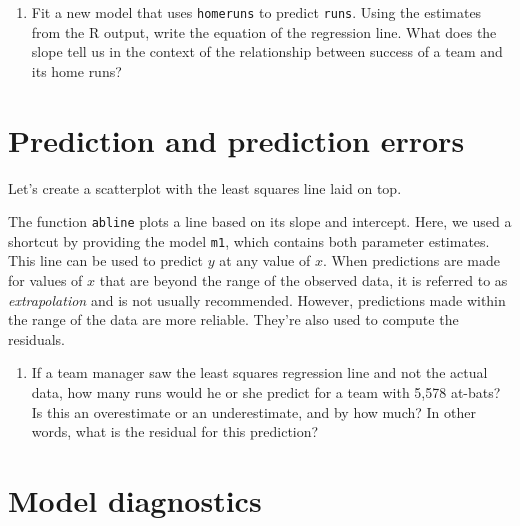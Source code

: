 \documentclass[]{book}
\newenvironment{Shaded}{\begin{snugshade}}{\end{snugshade}}
\newcommand{\KeywordTok}[1]{\textcolor[rgb]{0.13,0.29,0.53}{\textbf{{#1}}}}
\newcommand{\StringTok}[1]{\textcolor[rgb]{0.31,0.60,0.02}{{#1}}}
\newcommand{\NormalTok}[1]{{#1}}
\providecommand{\tightlist}{%
  \setlength{\itemsep}{0pt}\setlength{\parskip}{0pt}}
\theoremstyle{definition}
\theoremstyle{definition}
\theoremstyle{remark}
\begin{document}
\begin{enumerate}
\def\labelenumi{\arabic{enumi}.}
\setcounter{enumi}{3}
\tightlist
\item
  Fit a new model that uses \texttt{homeruns} to predict \texttt{runs}.
  Using the estimates from the R output, write the equation of the
  regression line. What does the slope tell us in the context of the
  relationship between success of a team and its home runs?
\end{enumerate}

\section*{Prediction and prediction
errors}\label{prediction-and-prediction-errors}

Let's create a scatterplot with the least squares line laid on top.

\begin{Shaded}
\end{Shaded}

The function \texttt{abline} plots a line based on its slope and
intercept. Here, we used a shortcut by providing the model \texttt{m1},
which contains both parameter estimates. This line can be used to
predict \(y\) at any value of \(x\). When predictions are made for
values of \(x\) that are beyond the range of the observed data, it is
referred to as \emph{extrapolation} and is not usually recommended.
However, predictions made within the range of the data are more
reliable. They're also used to compute the residuals.

\begin{enumerate}
\def\labelenumi{\arabic{enumi}.}
\setcounter{enumi}{4}
\tightlist
\item
  If a team manager saw the least squares regression line and not the
  actual data, how many runs would he or she predict for a team with
  5,578 at-bats? Is this an overestimate or an underestimate, and by how
  much? In other words, what is the residual for this prediction?
\end{enumerate}

\section*{Model diagnostics}\label{model-diagnostics}
\end{document}
